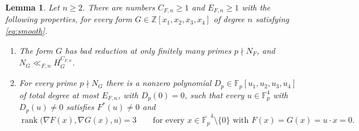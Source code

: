 \documentclass[11pt]{amsart}
\numberwithin{equation}{section}
\numberwithin{figure}{section}
\newtheorem{lemma}{Lemma}[section]
\theoremstyle{definition}
\newcommand{\Z}{\mathbb{Z}}
\newcommand{\Fp}{\mathbb F_p}
\begin{document}
\begin{lemma}\label{lem:exceptional}
Let $n\ge2$. There are numbers $C_{F,n}\ge1$ and $E_{F,n}\ge1$ with
the following properties, for every form $G\in\Z[x_1,x_2,x_3,x_4]$ of
degree $n$ satisfying \eqref{eq:smooth}.
\begin{enumerate}
\item[\textup{(i)}] The form $G$ has bad reduction at only finitely
many primes $p\nmid N_F$, and $N_G\ll_{F,n}H_G^{C_{F,n}}$.
\item[\textup{(ii)}] For every prime $p\nmid N_G$ there is a nonzero
polynomial $D_p\in\Fp[u_1,u_2,u_3,u_4]$ of total degree at most
$E_{F,n}$, with $D_p(0)=0$, such that every $u\in\Fp^4$ with
$D_p(u)\ne0$ satisfies $F^*(u)\ne0$ and
\begin{equation}\label{eq:transverse}
 \operatorname{rank}\big(\nabla F(x),\nabla G(x),u\big)=3
 \qquad\text{for every }x\in\overline{\Fp}^4\setminus\{0\}
 \text{ with }F(x)=G(x)=u\cdot x=0.
\end{equation}
\end{enumerate}
\end{lemma}
\end{document}
